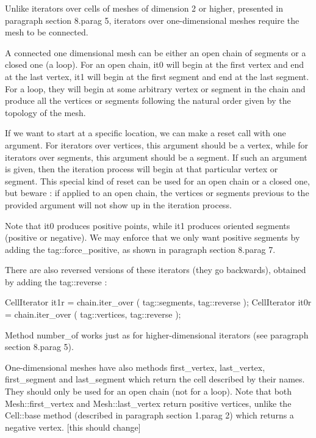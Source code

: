 Unlike iterators over cells of meshes of dimension 2 or higher, presented in paragraph
\numb section 8.\numb parag 5, iterators over one-dimensional meshes require the mesh
to be connected.

A connected one dimensional mesh can be either an open chain of segments or a closed one
(a loop).
For an open chain, {\codett it0} will begin at the first vertex and end at the last vertex,
{\codett it1} will begin at the first segment and end at the last segment.
For a loop, they will begin at some arbitrary vertex or segment in the chain and produce
all the vertices or segments following the natural order given by the topology of the mesh.

If we want to start at a specific location, we can make a {\codett reset} call with
one argument.
For iterators over vertices, this argument should be a vertex, while for iterators
over segments, this argument should be a segment.
If such an argument is given, then the iteration process will begin at that particular
vertex or segment.
This special kind of {\codett reset} can be used for an open chain or a closed one,
but beware : if applied to an open chain, the vertices or segments previous to the provided
argument will not show up in the iteration process.

Note that {\codett it0} produces positive points, while {\codett  it1} produces
oriented segments (positive or negative).
We may enforce that we only want positive segments by adding the {\codett tag::force\_positive},
as shown in paragraph \numb section 8.\numb parag 7.

There are also reversed versions of these iterators (they go backwards), obtained by adding
the {\codett tag::reverse} :

\verbatim
   CellIterator it1r = chain.iter_over ( tag::segments, tag::reverse );
   CellIterator it0r = chain.iter_over ( tag::vertices, tag::reverse );
\endverbatim

Method {\codett number\_of} works just as for higher-dimensional iterators (see paragraph
\numb section 8.\numb parag 5).

One-dimensional meshes have also methods {\codett first\_vertex}, {\codett last\_vertex},
{\codett first\_segment} and {\codett last\_segment} which return the cell described by their
names.
They should only be used for an open chain (not for a loop).
Note that both {\codett Mesh::first\_vertex} and {\codett Mesh::last\_vertex} return
positive vertices, unlike the {\codett Cell::base} method (described in paragraph
\numb section 1.\numb parag 2) which returns a negative vertex. [this should change]

